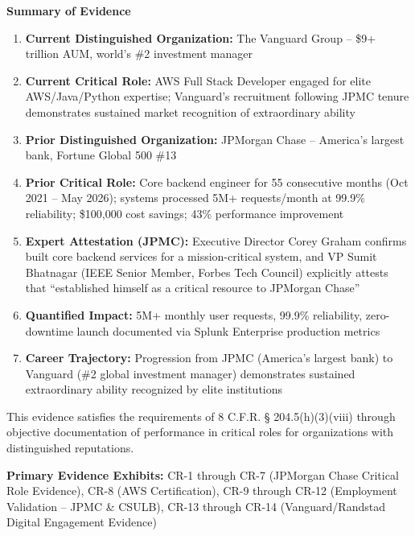 \textbf{Summary of Evidence}

\begin{enumerate}
    \item [$\checkmark$] \textbf{Current Distinguished Organization:} The Vanguard Group -- \$9+ trillion AUM, world's \#2 investment manager
    \item [$\checkmark$] \textbf{Current Critical Role:} AWS Full Stack Developer engaged for elite AWS/Java/Python expertise; Vanguard's recruitment following JPMC tenure demonstrates sustained market recognition of extraordinary ability
    \item [$\checkmark$] \textbf{Prior Distinguished Organization:} JPMorgan Chase -- America's largest bank, Fortune Global 500 \#13
    \item [$\checkmark$] \textbf{Prior Critical Role:} Core backend engineer for 55 consecutive months (Oct 2021 -- May 2026); systems processed 5M+ requests/month at 99.9\% reliability; \$100,000 cost savings; 43\% performance improvement
    \item [$\checkmark$] \textbf{Expert Attestation (JPMC):} Executive Director Corey Graham confirms \dr built core backend services for a mission-critical system, and VP Sumit Bhatnagar (IEEE Senior Member, Forbes Tech Council) explicitly attests that \dr ``established himself as a critical resource to JPMorgan Chase''
    \item [$\checkmark$] \textbf{Quantified Impact:} 5M+ monthly user requests, 99.9\% reliability, zero-downtime launch documented via Splunk Enterprise production metrics
    \item [$\checkmark$] \textbf{Career Trajectory:} Progression from JPMC (America's largest bank) to Vanguard (\#2 global investment manager) demonstrates sustained extraordinary ability recognized by elite institutions
\end{enumerate}

This evidence satisfies the requirements of 8 C.F.R. § 204.5(h)(3)(viii) through objective documentation of performance in critical roles for organizations with distinguished reputations.

\textbf{Primary Evidence Exhibits:} CR-1 through CR-7 (JPMorgan Chase Critical Role Evidence), CR-8 (AWS Certification), CR-9 through CR-12 (Employment Validation -- JPMC \& CSULB), CR-13 through CR-14 (Vanguard/Randstad Digital Engagement Evidence)

